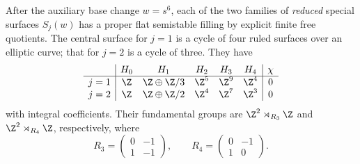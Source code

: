 \begin{proposition}\hypertarget{tag-01R6}{}\label{fam:src:E.2.1}\label{fam:st:E.2.1}

After the auxiliary base change $w=s^6$, each of the two families of
\emph{reduced} special surfaces $S_j(w)$ has a proper flat
semistable filling by explicit finite free quotients. The central
surface for $j=1$ is a cycle of four ruled surfaces over an elliptic
curve; that for $j=2$ is a cycle of three. They have
\[
\begin{array}{c|ccccc|c}
 &H_0&H_1&H_2&H_3&H_4&\chi\\\hline
 j=1&\Z&\Z\oplus\Z/3&\Z^5&\Z^9&\Z^4&0\\
 j=2&\Z&\Z\oplus\Z/2&\Z^4&\Z^7&\Z^3&0
\end{array}
\]
with integral coefficients. Their fundamental groups are
$\Z^2\rtimes_{R_3}\Z$ and $\Z^2\rtimes_{R_4}\Z$, respectively,
where
\[
 R_3=\begin{pmatrix}0&-1\\1&-1\end{pmatrix},\qquad
 R_4=\begin{pmatrix}0&-1\\1&0\end{pmatrix}.
\]
\end{proposition}



